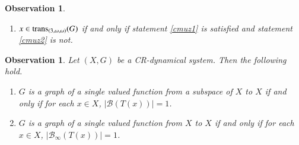 \documentclass[a4paper,12pt]{article} %
\newcommand{\trans}{\textup{trans}}
\newtheorem{observation}[theorem]{Observation}
\begin{document}
\begin{observation}
\begin{enumerate}
\begin{enumerate}
\item for all $i,j\in \{1,2,3,\ldots, n\}$, 
$$
T_i=T_j \Longleftrightarrow i=j,
$$
\item $T_1\cup T_2\cup T_3\cup \ldots \cup T_n$ is dense in $X$,
\end{enumerate}
and for each positive integer $m$, if $T_1,T_2,T_3,\ldots ,T_m\in \mathcal B_{\infty}(T(x))$  such that
\begin{enumerate}
\item for all $i,j\in \{1,2,3,\ldots, m\}$, 
$$
T_i=T_j \Longleftrightarrow i=j,
$$
\item $T_1\cup T_2\cup T_3\cup \ldots \cup T_m$ is dense in $X$,
\end{enumerate}
then $m\geq n$.
\item $x\in \trans_{(3,\omega,\omega)}(G)$ if and only if statement \ref{cmuz1} is satisfied and statement \ref{cmuz2} is not.
\end{enumerate}
\end{observation}
\begin{observation}
Let $(X,G)$ be a CR-dynamical system. Then the following hold.
\begin{enumerate}
\item $G$ is a graph of a single valued function from a subspace of $X$ to $X$ if and only if for each $x\in X$,  $|\mathcal B(T(x))|=1$.
\item $G$ is a graph of a single valued function from $X$ to $X$ if and only if for each $x\in X$,   $|\mathcal B_{\infty}(T(x))|=1$.
\end{enumerate}
\end{observation}
\end{document}
